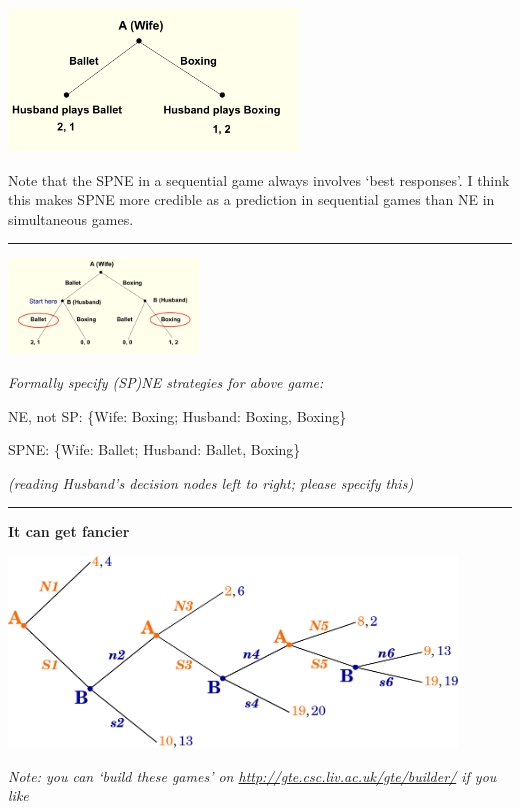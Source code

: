 \documentclass[]{article}
\begin{document}
\includegraphics[height=1.5in]{picsfigs/bosbwi2.png}

Note that the SPNE in a sequential game always involves `best
responses'. I think this makes SPNE more credible as a prediction in
sequential games than NE in simultaneous games.

\begin{center}\rule{0.5\linewidth}{\linethickness}\end{center}

\includegraphics[height=1in]{picsfigs/bosbwi1.png}

\emph{Formally specify (SP)NE strategies for above game:}

NE, not SP: \{Wife: Boxing; Husband: Boxing, Boxing\}

SPNE: \{Wife: Ballet; Husband: Ballet, Boxing\}

\emph{(reading Husband's decision nodes left to right; please specify
this)}

\begin{center}\rule{0.5\linewidth}{\linethickness}\end{center}

\textbf{It can get fancier}

\includegraphics[height=2in]{picsfigs/longgamework_randompayoffs_noul.png}

\emph{Note: you can `build these games' on
\url{http://gte.csc.liv.ac.uk/gte/builder/} if you like}
\end{document}
